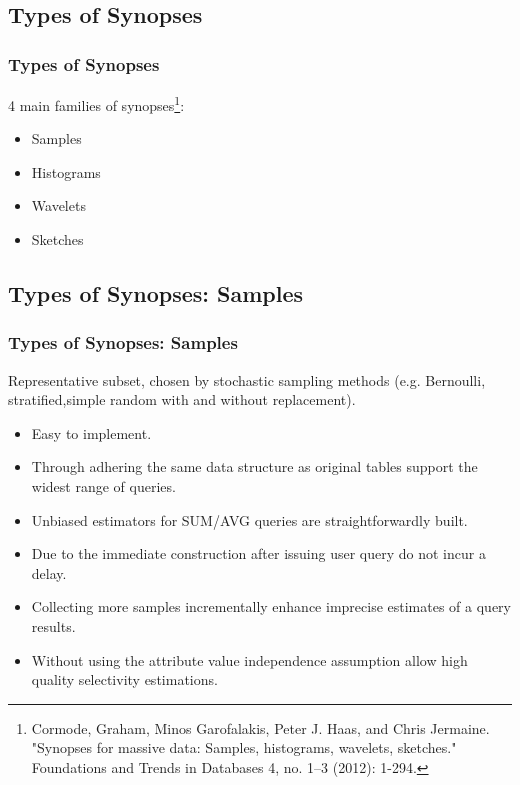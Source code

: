 \documentclass{beamer}
\begin{document}
\subsection{Types of Synopses}
\begin{frame}
\frametitle{Types of Synopses}
4 main families of synopses\footnote{\tiny Cormode, Graham, Minos Garofalakis, Peter J. Haas, and Chris Jermaine. "Synopses for massive data:
Samples, histograms, wavelets, sketches." Foundations and Trends in Databases 4, no. 1–3 (2012): 1-294.}:
\begin{itemize}
\vspace{0.3 cm}
\item{Samples}
\item{Histograms}
\item{Wavelets}
\item{Sketches}
\end{itemize}
\end{frame}

\subsection{Types of Synopses: Samples}
\begin{frame}
\frametitle{Types of Synopses: Samples}
Representative subset, chosen by stochastic sampling methods (e.g. Bernoulli, stratified,simple random with and without replacement).\pause
\vspace{0.2 cm}
\begin{itemize}
\item{Easy to implement.}
\item{Through adhering the same data structure as original tables support the widest range of queries.}
\item{Unbiased estimators for SUM/AVG queries are straightforwardly built.}
\item{Due to the immediate construction after issuing user query do not incur a delay.}
\item{Collecting more samples incrementally enhance imprecise estimates of a query results.}
\item{Without using the attribute value independence assumption allow high quality selectivity estimations.}
\end{itemize}
\end{frame}
\end{document}
